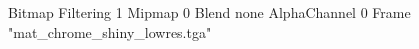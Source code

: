 {Bitmap
	{Filtering 1}
	{Mipmap 0}
	{Blend none}
	{AlphaChannel 0}
	{Frame "mat_chrome_shiny_lowres.tga"}
}
